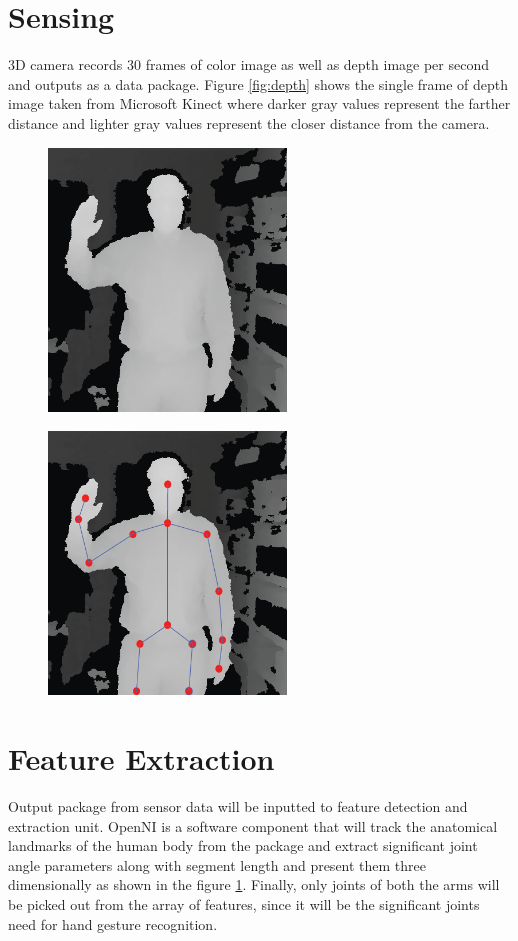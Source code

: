 \section{Sensing} 
3D camera records 30 frames of color image as well as depth image per second and outputs as a data package. Figure \ref{fig:depth} shows the single frame of depth image taken from Microsoft Kinect where darker gray values represent the farther distance and lighter gray values represent the closer distance from the camera.

\begin{figure}
	\centering
	\begin{minipage}{.5\textwidth}
		\centering
\includegraphics[height=7cm]{figures/depth.png} 
		\label{fig:depth}
	\end{minipage}%
	\begin{minipage}{.5\textwidth}
		\centering
		\includegraphics[height=7cm]{figures/depth-skeleton.png}
		\label{fig:skeleton}
	\end{minipage}
\end{figure}

\section{Feature Extraction}
Output package from sensor data will be inputted to feature detection and extraction unit. OpenNI is a software component that will track the anatomical landmarks of the human body from the package and extract significant joint angle parameters along with segment length and present them three dimensionally as shown in the figure \ref{fig:skeleton}. Finally, only joints of both the arms will be picked out from the array of features, since it will be the significant joints need for hand gesture recognition.

